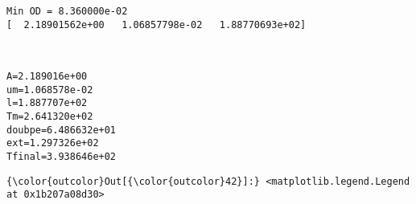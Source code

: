 \documentclass[11pt]{article}
\begin{document}
    \begin{Verbatim}[commandchars=\\\{\}]
Min OD = 8.360000e-02
[  2.18901562e+00   1.06857798e-02   1.88770693e+02]

    \end{Verbatim}

    \begin{center}
    \end{center}
    { \hspace*{\fill} \\}
    
    \begin{Verbatim}[commandchars=\\\{\}]
A=2.189016e+00
um=1.068578e-02
l=1.887707e+02
Tm=2.641320e+02
doubpe=6.486632e+01
ext=1.297326e+02
Tfinal=3.938646e+02

    \end{Verbatim}

            \begin{Verbatim}[commandchars=\\\{\}]
{\color{outcolor}Out[{\color{outcolor}42}]:} <matplotlib.legend.Legend at 0x1b207a08d30>
\end{Verbatim}
        
    \begin{center}
    \end{center}
    { \hspace*{\fill} \\}
    
    \begin{center}
    \end{center}
    { \hspace*{\fill} \\}
    
\end{document}
